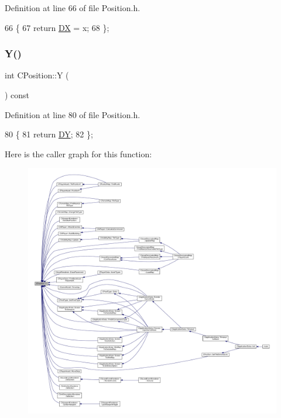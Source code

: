Definition at line 66 of file Position.\+h.


\begin{DoxyCode}
66                     \{
67             \textcolor{keywordflow}{return} \hyperlink{classCPosition_a28445f9b872169715919074d82044eda}{DX} = x;  
68         \};
\end{DoxyCode}
\hypertarget{classCPosition_a1aa8a30e2f08dda1f797736ba8c13a87}{}\label{classCPosition_a1aa8a30e2f08dda1f797736ba8c13a87} 
\subsubsection{\texorpdfstring{Y()}{Y()}\hspace{0.1cm}{\footnotesize\ttfamily [1/2]}}
{\footnotesize\ttfamily int C\+Position\+::Y (\begin{DoxyParamCaption}{ }\end{DoxyParamCaption}) const\hspace{0.3cm}{\ttfamily [inline]}}



Definition at line 80 of file Position.\+h.


\begin{DoxyCode}
80                      \{
81             \textcolor{keywordflow}{return} \hyperlink{classCPosition_a84139c9e8eb547e7cf3cb851739943a4}{DY};
82         \};
\end{DoxyCode}
Here is the caller graph for this function\+:\nopagebreak
\begin{figure}[H]
\begin{center}
\leavevmode
\includegraphics[width=350pt]{classCPosition_a1aa8a30e2f08dda1f797736ba8c13a87_icgraph}
\end{center}
\end{figure}
\hypertarget{classCPosition_a182107c1ded8662afc75f876fa1b990d}{}\label{classCPosition_a182107c1ded8662afc75f876fa1b990d} 
